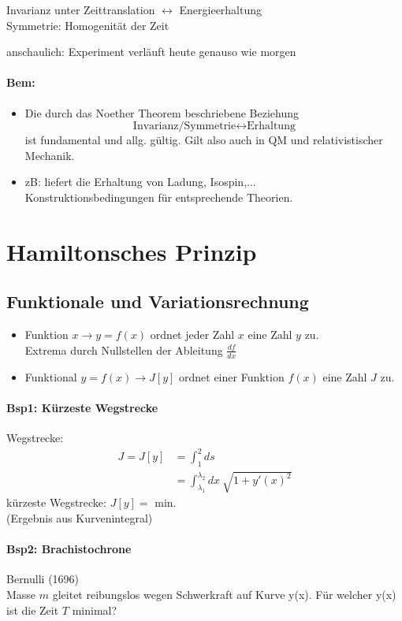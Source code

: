 \documentclass[titlepage,12pt,a4paper,ngerman]{report}
\newcommand{\tx}[1]{\textrm{#1}}
\newcommand{\rbox}[1]{\begin{tcolorbox}[colback=white,colframe=red!75!black]#1\end{tcolorbox}} %
\begin{document}
\rbox{Invarianz unter Zeittranslation $\leftrightarrow$ Energieerhaltung\\
	Symmetrie: Homogenität der Zeit}
anschaulich: Experiment verläuft heute genauso wie morgen
\paragraph{Bem:}
\begin{itemize}
	\item Die durch das Noether Theorem beschriebene Beziehung
	$$\tx{Invarianz/Symmetrie} \leftrightarrow \tx{Erhaltung}$$
	ist fundamental und allg. gültig. Gilt also auch in QM und relativistischer Mechanik.
	\item zB: liefert die Erhaltung von Ladung, Isospin,...\\
	Konstruktionsbedingungen für entsprechende Theorien.
\end{itemize}

\section{Hamiltonsches Prinzip}
\setcounter{equation}{0}
\subsection{Funktionale und Variationsrechnung}
\begin{itemize}
	\item Funktion $x \rightarrow y = f(x)$ ordnet jeder Zahl $x$ eine Zahl $y$ zu.\\
	Extrema durch Nullstellen der Ableitung $\frac{df}{dx}$
	\item Funktional $y = f(x) \rightarrow J[y]$ ordnet einer Funktion $f(x)$ eine Zahl $J$ zu.
\end{itemize}
\paragraph{Bsp1: Kürzeste Wegstrecke} %
Wegstrecke: 
\begin{align*}
J = J[y] &= \int_1^2 ds\\
&=\int_{\lambda_1}^{\lambda_2} dx\ \sqrt{1+ y'(x)^2}
\end{align*}
kürzeste Wegstrecke: $J[y] = \tx{ min.}$\\
(Ergebnis aus Kurvenintegral)
\paragraph{Bsp2: Brachistochrone} Bernulli (1696)\\ %
Masse $m$ gleitet reibungslos wegen Schwerkraft auf Kurve y(x). Für welcher y(x) ist die Zeit $T$ minimal?\\
\end{document}
